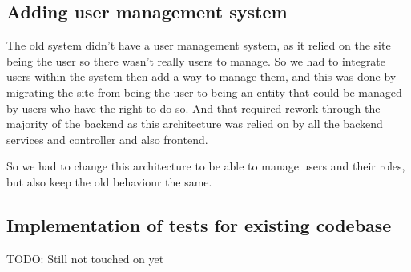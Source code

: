 \subsection {Adding user management system}

The old system didn't have a user management system, as it relied on the site being the
user so there wasn't really users to manage. So we had to integrate users within the system
then add a way to manage them, and this was done by migrating the site from being the user
to being an entity that could be managed by users who have the right to do so.
And that required rework through the majority of the backend as this architecture was
relied on by all the backend services and controller and also frontend.

So we had to change this architecture to be able to manage users and their roles, but also
keep the old behaviour the same.


\subsection {Implementation of tests for existing codebase}

TODO: Still not touched on yet
